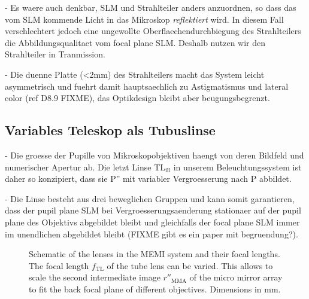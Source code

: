   - Es waere auch denkbar, SLM und Strahlteiler anders anzuordnen, so
    dass das vom SLM kommende Licht in das Mikroskop
    \emph{reflektiert} wird. In diesem Fall verschlechtert jedoch eine
    ungewollte Oberflaechendurchbiegung des Strahlteilers die
    Abbildungsqualitaet vom focal plane SLM. Deshalb nutzen wir den
    Strahlteiler in Tranmission.

  - Die duenne Platte (<2mm) des Strahlteilers macht das System leicht
    asymmetrisch und fuehrt damit hauptsaechlich zu Astigmatismus und
    lateral color (ref D8.9 FIXME), das Optikdesign bleibt aber
    beugungsbegrenzt.





\subsection{ Variables Teleskop als Tubuslinse}
  - Die groesse der Pupille von Mikroskopobjektiven haengt von deren
    Bildfeld und numerischer Apertur ab. Die letzt Linse
    TL${}_\textrm{ill}$ in unserem Beleuchtungssystem ist daher so
    konzipiert, dass sie P'' mit variabler Vergroesserung nach P
    abbildet. 

  - Die Linse besteht aus drei beweglichen Gruppen und kann somit
    garantieren, dass der pupil plane SLM bei Vergroesserungsaenderung
    stationaer auf der pupil plane des Objektivs abgebildet bleibt und
    gleichfalls der focal plane SLM immer im unendlichen abgebildet
    bleibt (FIXME gibt es ein paper mit begruendung?).





\begin{figure}[!htbp]
   \centering
   \caption{Schematic of the lenses in the MEMI system and their focal
     lengths. The focal length $f_\textrm{TL}$ of the tube lens can be
     varied. This allows to scale the second intermediate image
     $r''_\textrm{MMA}$ of the micro mirror array to fit the back
     focal plane of different objectives. Dimensions in mm.}
   \label{fig:memi-sketch}
 \end{figure}




